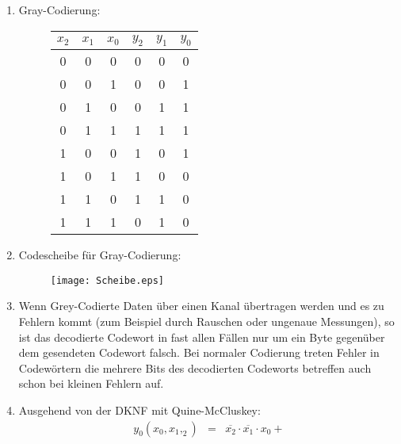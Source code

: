 \documentclass[DIN, pagenumber=false, fontsize=11pt, parskip=half]{scrartcl}
\begin{document}
    \subsection{}
    \begin{enumerate}[label=(\alph*)]
        \item 
            Gray-Codierung:
            \begin{figure}[H]
                \centering
                \begin{tabular}{ccc|ccc}
                    \toprule
                    $x_2$ & $x_1$ & $x_0$ & $y_2$ & $y_1$ & $y_0$ \\
                    \midrule
                    0 & 0 & 0 & 0 & 0 & 0\\
                    0 & 0 & 1 & 0 & 0 & 1\\
                    0 & 1 & 0 & 0 & 1 & 1\\
                    0 & 1 & 1 & 1 & 1 & 1\\
                    1 & 0 & 0 & 1 & 0 & 1\\
                    1 & 0 & 1 & 1 & 0 & 0\\
                    1 & 1 & 0 & 1 & 1 & 0\\
                    1 & 1 & 1 & 0 & 1 & 0\\
                    \bottomrule
                \end{tabular}
            \end{figure}
        \item 
            Codescheibe für Gray-Codierung:
            \begin{figure}[H]
                \centering
                \texttt{[image: Scheibe.eps]}
            \end{figure}
        \item Wenn Grey-Codierte Daten über einen Kanal übertragen werden und
            es zu Fehlern kommt (zum Beispiel durch Rauschen oder ungenaue Messungen), so ist das decodierte Codewort in fast allen Fällen nur um ein
            Byte gegenüber dem gesendeten Codewort falsch. Bei \glqq{}normaler\grqq{} Codierung treten Fehler in Codewörtern die mehrere Bits des decodierten Codeworts betreffen auch schon bei kleinen Fehlern auf.
        \item 
            Ausgehend von der DKNF mit Quine-McCluskey:
            \begin{eqnarray*}
                y_0(x_0, x_1, _2) &=& 
                \overline{x_2} \cdot \overline{x_1} \cdot x_0 + 

\end{eqnarray*}
\end{enumerate}
\end{document}
